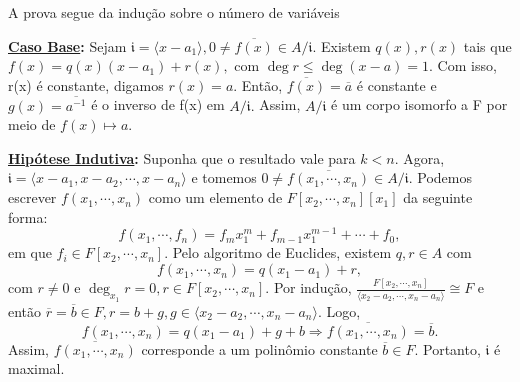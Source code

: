 \documentclass[algebraII_notes.tex]{subfiles}
\begin{document}
\begin{proof*}

	A prova segue da indução sobre o número de variáveis

	\textbf{\underline{Caso Base}:} Sejam \(\mathfrak{i} = \langle x - a_{1} \rangle, 0\neq \overline{f(x)}\in A/\mathfrak{i}.\)
	Existem \(q(x), r(x)\) tais que \(f(x) = q(x)(x-a_{1})+r(x),\) com \(\deg{r}\leq \deg{(x-a)}=1.\) Com isso,
	r(x) é constante, digamos \(r(x) = a\). Então, \(\overline{f(x)}=\overline{a}\) é constante e
	\(g(x) = \overline{a^{-1}}\) é o inverso de f(x) em \(A/\mathfrak{i}.\) Assim, \(A/\mathfrak{i}\) é um corpo isomorfo a F por meio
	de \(f(x)\mapsto a.\)

	\textbf{\underline{Hipótese Indutiva}:} Suponha que o resultado vale para \(k < n\). Agora, \(\mathfrak{i} = \langle x-a_{1}, x-a_{2}, \cdots, x-a_{n} \rangle\) e tomemos
	\(0\neq \overline{f(x_{1}, \cdots, x_{n})}\in A/\mathfrak{i}\). Podemos escrever
	\(f(x_{1}, \cdots, x_{n})\) como um elemento de \(F[x_{2}, \cdots, x_{n}][x_{1}]\) da seguinte forma:
	\[
		f(x_{1}, \cdots, f_{n}) = f_{m}x_{1}^{m} + f_{m-1}x_{1}^{m-1} + \cdots + f_{0},
	\]
	em que \(f_{i}\in F[x_{2}, \cdots, x_{n}].\) Pelo algoritmo de Euclides, existem \(q, r\in A\) com
	\[
		f(x_{1}, \cdots, x_{n}) = q(x_{1} - a_{1} ) + r,
	\]
	com \(r\neq0\) e \(\deg_{x_{1}}{r} = 0, r \in F[x_{2}, \cdots, x_{n}].\) Por indução, \(\frac{F[x_{2}, \cdots, x_{n}]}{\langle x_{2}-a_{2}, \cdots, x_{n}-a_{n} \rangle}\cong{F}\) e
	então \(\overline{r} = \overline{b}\in F, r = b+g, g\in \langle x_{2}-a_{2}, \cdots, x_{n}-a_{n} \rangle\). Logo,
	\[
		f(x_{1}, \cdots, x_{n}) = q(x_{1}-a_{1}) + g + b \Rightarrow \overline{f(x_{1}, \cdots, x_{n})} = \overline{b}.
	\]
	Assim, \(\overline{f(x_{1}, \cdots, x_{n})}\) corresponde a um polinômio constante \(\overline{b}\in F.\)
	Portanto, \(\mathfrak{i}\) é maximal. \qedsymbol
\end{proof*}
\end{document}
